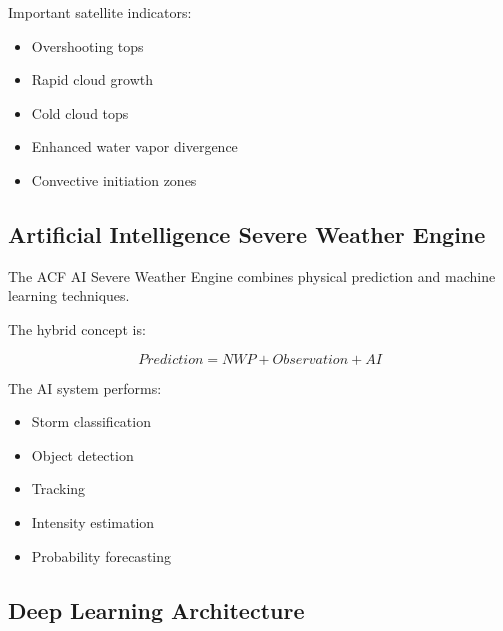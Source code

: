 Important satellite indicators:

\begin{itemize}

\item Overshooting tops

\item Rapid cloud growth

\item Cold cloud tops

\item Enhanced water vapor divergence

\item Convective initiation zones

\end{itemize}



\subsection{Artificial Intelligence Severe Weather Engine}

The ACF AI Severe Weather Engine combines physical prediction and
machine learning techniques.

The hybrid concept is:

\[
Prediction =
NWP
+
Observation
+
AI
\]


The AI system performs:

\begin{itemize}

\item Storm classification

\item Object detection

\item Tracking

\item Intensity estimation

\item Probability forecasting

\end{itemize}



\subsection{Deep Learning Architecture}

